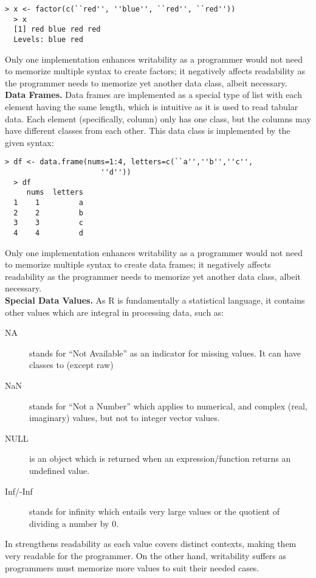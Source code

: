 \documentclass[12pt]{article}
\begin{document}
\begin{lstlisting}[frame=single]
  > x <- factor(c(``red'', ''blue'', ``red'', ``red''))
  > x
  [1] red blue red red
  Levels: blue red
\end{lstlisting}

Only one implementation enhances writability as a programmer would not need to memorize multiple syntax to create factors; it negatively affects readability as the programmer needs to memorize yet another data class, albeit necessary.\\

\textbf{Data Frames.} Data frames are implemented as a special type of list with each element having the same length, which is intuitive as it is used to read tabular data. Each element (specifically, column) only has one class, but the columns may have different classes from each other. This data class is implemented by the given syntax:

\begin{lstlisting}[frame=single]
  > df <- data.frame(nums=1:4, letters=c(``a'',''b'',''c'',
                      ''d''))
  > df
     nums  letters
  1    1         a
  2    2         b
  3    3         c
  4    4         d
\end{lstlisting}

Only one implementation enhances writability as a programmer would not need to memorize multiple syntax to create data frames; it negatively affects readability as the programmer needs to memorize yet another data class, albeit necessary.\\

\textbf{Special Data Values.} As R is fundamentally a statistical language, it contains other values which are integral in processing data, such as:
\begin{description}
\item[NA] stands for ``Not Available'' as an indicator for missing values. It can have classes to (except raw)
\item[NaN] stands for ``Not a Number'' which applies to numerical, and complex (real, imaginary) values, but not to integer vector values.
\item[NULL] is an object which is returned when an expression/function returns an undefined value.
\item[Inf/-Inf] stands for infinity which entails very large values or the quotient of dividing a number by 0.
\end{description}

In strengthens readability as each value covers distinct contexts, making them very readable for the programmer. On the other hand, writability suffers as programmers must memorize more values to suit their needed cases.
\end{document}
